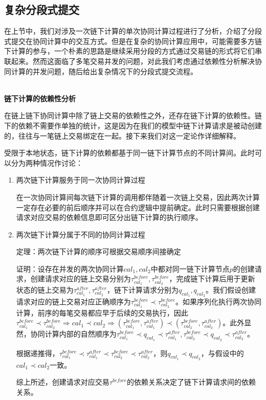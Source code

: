 \subsection{复杂分段式提交}
在上节中，我们对涉及一次链下计算的单次协同计算过程进行了分析，介绍了分段式提交在协同计算中的交互方式。但是在复杂的协同计算应用中，可能需要多方链下计算的参与，一个朴素的思路是继续采用分段的方式通过交易链的形式将它们串联起来。然而这面临了多笔交易并发的问题，对此我们考虑通过依赖性分析解决协同计算的并发问题，随后给出复杂情况下的分段式提交流程。

~\\
\noindent\textbf{链下计算的依赖性分析}

在链上链下协同计算中除了链上交易的依赖性之外，还存在链下计算的依赖性。链下的依赖不需要作单独的统计，这是因为在我们的模型中链下计算请求是被动创建的，往往与一笔链上交易绑定在一起。接下来我们对这一定论作详细解释。

受限于本地状态，链下计算的依赖都基于同一链下计算节点的不同计算间。此时可以分为两种情况作讨论：
\begin{enumerate}
    \item 两次链下计算服务于同一次协同计算过程
    
    在一次协同计算间每次链下计算的调用都伴随着一次链上交易，因此两次计算一定存在必要的前后顺序并可以在合约逻辑中提前确定。此时只需要根据创建请求对应交易的依赖信息即可区分出链下计算的执行顺序。
    \item 两次链下计算分属于不同的协同计算过程
    
    定理：两次链下计算的顺序可根据交易顺序间接确定

    证明：设存在并发的两次协同计算${cal}_1, {cal}_2$中都对同一链下计算节点$p$的创建请求，创建请求对应的链上交易分别为$\tau_{{cal}_1}^{before}, \tau_{{cal}_2}^{before}$，完成链下计算后用于更新状态的链上交易为$\tau_{{cal}_1}^{after}, \tau_{{cal}_2}^{after}$，链下计算请求分别为$q_{{cal}_1}, q_{{cal}_2}$。我们假设创建请求对应的链上交易对应正确顺序为$\tau_{{cal}_1}^{before} \prec \tau_{{cal}_2}^{before}$。如果序列化执行两次协同计算，前序的每笔交易都应早于后续的交易执行，因此$\tau_{{cal}_1}^{before} \prec \tau_{{cal}_2}^{before} \Rightarrow {cal}_1\prec{cal}_2 \Rightarrow (\tau_{{cal}_1}^{before}, \tau_{{cal}_1}^{after})\prec (\tau_{{cal}_2}^{before},\tau_{{cal}_2}^{after}) $。此外显然，协同计算内部的自然顺序为$\tau_{{cal}_1}^{before}\prec q_{{cal}_1} \prec \tau_{{cal}_1}^{after}, \tau_{{cal}_2}^{before}\prec q_{{cal}_2} \prec \tau_{{cal}_2}^{after}$。
    
    根据递推得，$\tau_{{cal}_1}^{before} \prec \tau_{{cal}_1}^{after} \prec \tau_{{cal}_2}^{before} \prec \tau_{{cal}_2}^{after}$，则$q_{{cal}_1} \prec q_{{cal}_2}$，与假设中的${cal}_1\prec{cal}_2$一致。
    
    综上所述，创建请求对应交易$\tau^{before}$的依赖关系决定了链下计算请求间的依赖关系。
\end{enumerate}

